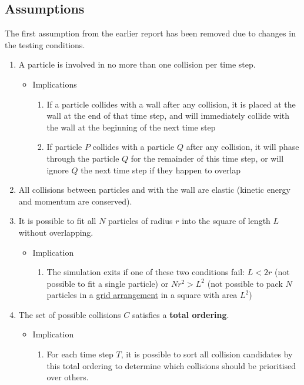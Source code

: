 \documentclass[12pt]{article}
\begin{document}
\subsection{Assumptions}

The first assumption from the earlier report has been removed due to changes in the testing conditions.

\begin{enumerate}
	\item A particle is involved in no more than one collision per time step.
	\begin{itemize}
		\item Implications
		\begin{enumerate}
			\item If a particle collides with a wall after any collision, it is placed at the wall at the end of that time step, and will immediately collide with the wall at the beginning of the next time step
			\item If particle $P$ collides with a particle $Q$ after any collision, it will phase through the particle $Q$ for the remainder of this time step, or will ignore $Q$ the next time step if they happen to overlap
		\end{enumerate}
	\end{itemize}
	\item All collisions between particles and with the wall are elastic (kinetic energy and momentum are conserved). 
	\item It is possible to fit all $N$ particles of radius $r$ into the square of length $L$ without overlapping.
	\begin{itemize}
		\item Implication
		\begin{enumerate}
			\item The simulation exits if one of these two conditions fail: $L < 2r$ (not possible to fit a single particle) or $Nr^2 > L^2$ (not possible to pack $N$ particles in a \ul{grid arrangement} in a square with area $L^2$)
		\end{enumerate}
	\end{itemize}
	\item The set of possible collisions $C$ satisfies a \textbf{total ordering}.
	\begin{itemize}
		\item Implication
		\begin{enumerate}
			\item For each time step $T$, it is possible to sort all collision candidates by this total ordering to determine which collisions should be prioritised over others.
		\end{enumerate}
	\end{itemize}
\end{enumerate}
\end{document}
